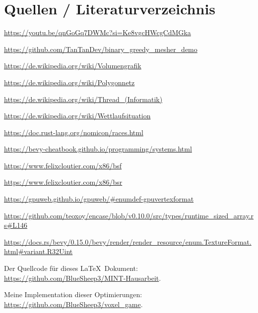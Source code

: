 \section{Quellen / Literaturverzeichnis}


\renewcommand{\section}[2]{}

\begin{thebibliography}{99}

\setlength{\itemindent}{0.25cm}

\url{https://youtu.be/qnGoGq7DWMc?si=Ke8vgcHWcgCdMGka}

\url{https://github.com/TanTanDev/binary_greedy_mesher_demo}

\url{https://de.wikipedia.org/wiki/Volumengrafik}

\url{https://de.wikipedia.org/wiki/Polygonnetz}

\url{https://de.wikipedia.org/wiki/Thread_(Informatik)}

\url{https://de.wikipedia.org/wiki/Wettlaufsituation}

\url{https://doc.rust-lang.org/nomicon/races.html}

\url{https://bevy-cheatbook.github.io/programming/systems.html}

\url{https://www.felixcloutier.com/x86/bsf}

\url{https://www.felixcloutier.com/x86/bsr}

\url{https://gpuweb.github.io/gpuweb/#enumdef-gpuvertexformat}

\url{https://github.com/teoxoy/encase/blob/v0.10.0/src/types/runtime_sized_array.rs#L146}

\url{https://docs.rs/bevy/0.15.0/bevy/render/render_resource/enum.TextureFormat.html#variant.R32Uint}

\end{thebibliography}


\vspace{0.2cm}

\setlength{\parindent}{0pt}

Der Quellcode für dieses \LaTeX\ Dokument: \\
\url{https://github.com/BlueSheep3/MINT-Hausarbeit}.

\vspace{0.2cm}

Meine Implementation dieser Optimierungen: \\
\url{https://github.com/BlueSheep3/voxel_game}.
